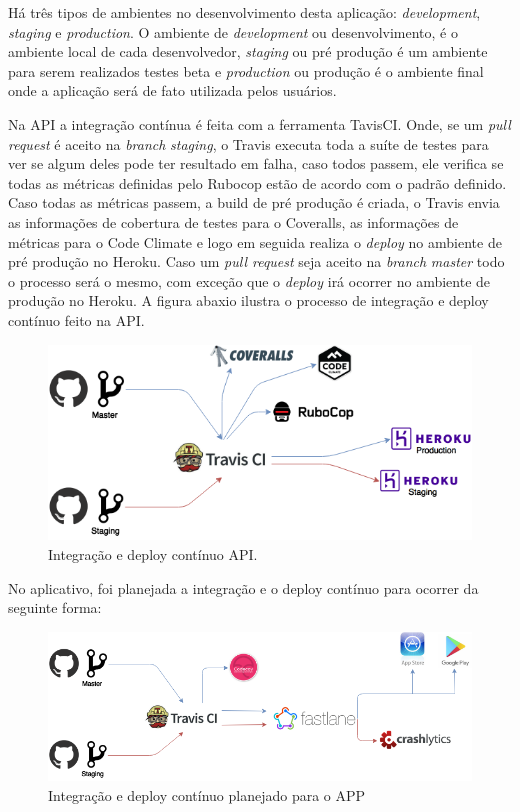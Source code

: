 Há três tipos de ambientes no desenvolvimento desta aplicação: \textit{development}, \textit{staging} e \textit{production}. O ambiente de
\textit{development} ou desenvolvimento, é o ambiente local de cada desenvolvedor, \textit{staging} ou pré produção
é um ambiente para serem realizados testes beta e \textit{production} ou produção é o ambiente final onde a aplicação será de fato
utilizada pelos usuários.

Na API a integração contínua é feita com a ferramenta TavisCI. Onde, se um \textit{pull request} é aceito na \textit{branch} \textit{staging},
o Travis executa toda a suíte de testes para ver se algum deles pode ter resultado em falha, caso todos passem, ele verifica se todas as métricas
definidas pelo Rubocop estão de acordo com o padrão definido. Caso todas as métricas passem, a build de pré produção é criada, o Travis envia as informações de cobertura
de testes para o Coveralls, as informações de métricas para o Code Climate e logo em seguida realiza o \textit{deploy} no ambiente de pré produção no Heroku.
Caso um \textit{pull request} seja aceito na \textit{branch} \textit{master} todo o processo será o mesmo, com exceção que o \textit{deploy} irá ocorrer no ambiente de produção no Heroku.
A figura abaxio ilustra o processo de integração e deploy contínuo feito na API.

\begin{figure}[H]
    \centering
    \includegraphics[scale=0.5]{figuras/api_ci.png}
    \caption[Integração e deploy contínuo API]{Integração e deploy contínuo API.}
    \label{img:integracao_deploy_continuo_api}
\end{figure}

No aplicativo, foi planejada a integração e o deploy contínuo para ocorrer da seguinte forma:

\begin{figure}[H]
    \centering
    \includegraphics[scale=0.5]{figuras/ci_should_be.png}
    \caption[Integração e deploy contínuo planejado para o APP]{Integração e deploy contínuo planejado para o APP}
    \label{img:integracao_deploy_continuo_planejado_app}
\end{figure}

